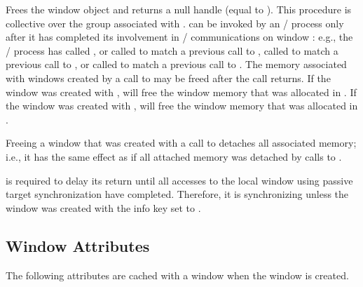 Frees the window object  and returns a null handle
(equal to ).
This procedure is collective over the group
associated with .  can be
invoked by an \mpi/ process only after it has completed its involvement in
\RMA/ communications on window : e.g., the \mpi/ process has
called , or called
 to match a previous call to
, called  to
match a previous call to , or called
 to match a previous call to
.
The
memory associated with windows created by a call to
 may be freed after the call returns.
If the
window was created with ,
 will free the window memory that was allocated
in .
If the
window was created with ,
 will free the window memory that was allocated
in .

Freeing a window that was created with a call to
 detaches all associated memory;
i.e., it has the same effect as if all attached memory was
detached by calls to .

 is required to delay its return until all
accesses to the local window using passive target synchronization have completed.
Therefore, it is synchronizing unless the window was created with the  info key set to .

\subsection{Window Attributes}

The following attributes are cached with a
window when the
window is created.
\begin{constlist}
\end{constlist}

